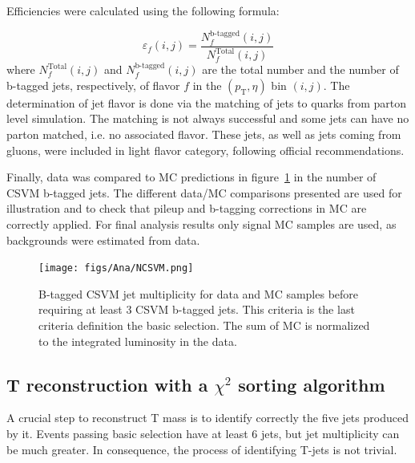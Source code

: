 Efficiencies were calculated using the following formula:

\begin{equation}
  \label{eq:btaggingeff}
  \varepsilon_f(i,j) = \frac{N_f^\text{b-tagged}(i,j)}{N_f^\text{Total}(i,j)}
\end{equation} where $ N_f^\text{Total}(i,j) $ and $ N_f^\text{b-tagged}(i,j) $ are the total number and the number of b-tagged jets, respectively, of flavor $ f $ in the $ (p_\text{T},\eta) $ bin $ (i,j) $. The determination of jet flavor is done via the matching of jets to quarks from parton level simulation. The matching is not always successful and some jets can have no parton matched, i.e. no associated flavor. These jets, as well as jets coming from gluons, were included in light flavor category, following official recommendations.

Finally, data was compared to MC predictions in figure~\ref{fig:Nb} in the number of CSVM b-tagged jets. The different data/MC comparisons presented are used for illustration and to check that pileup and b-tagging corrections in MC are correctly applied. For final analysis results only signal MC samples are used, as backgrounds were estimated from data.

\begin{figure}[!Hhtbp]
  \begin{center}
    \texttt{[image: figs/Ana/NCSVM.png]}
    \caption{B-tagged CSVM jet multiplicity for data and MC samples before requiring at least 3 CSVM b-tagged jets. This criteria is the last criteria definition the basic selection. The sum of MC is normalized to the integrated luminosity in the data.}
    \label{fig:Nb}
  \end{center}
\end{figure}

\subsection{T reconstruction with a $\chi^{2}$ sorting algorithm}
\label{sec:chi2}

A crucial step to reconstruct T mass is to identify correctly the five jets produced by it. Events passing basic selection have at least 6 jets, but jet multiplicity can be much greater. In consequence, the process of identifying T-jets is not trivial. 

